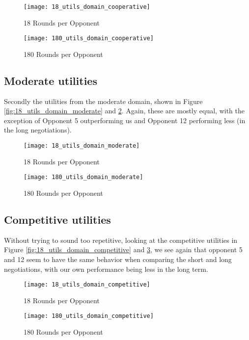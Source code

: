 \begin{figure}[!htb]
	\texttt{[image: 18\_utils\_domain\_cooperative]}
	\caption{18 Rounds per Opponent}
	\label{fig:18_utils_domain_cooperative}
	\endminipage\hfill
	\texttt{[image: 180\_utils\_domain\_cooperative]}
	\caption{180 Rounds per Opponent}
	\label{fig:180_utils_domain_cooperative}
	\endminipage\hfill
\end{figure}

\subsection{Moderate utilities}

Secondly the utilities from the moderate domain, shown in Figure \ref{fig:18_utils_domain_moderate} and \ref{fig:180_utils_domain_moderate}. Again, these are mostly equal, with the exception of Opponent 5 outperforming us and Opponent 12 performing less (in the long negotiations). 

\begin{figure}[!htb]
	\texttt{[image: 18\_utils\_domain\_moderate]}
	\caption{18 Rounds per Opponent}
	\label{fig:18_utils_domain_moderate}
	\endminipage\hfill
	\texttt{[image: 180\_utils\_domain\_moderate]}
	\caption{180 Rounds per Opponent}
	\label{fig:180_utils_domain_moderate}
	\endminipage\hfill
\end{figure}

\subsection{Competitive utilities}

Without trying to sound too repetitive, looking at the competitive utilities in  Figure \ref{fig:18_utils_domain_competitive} and \ref{fig:180_utils_domain_competitive}, we see again that opponent 5 and 12 seem to have the same behavior when comparing the short and long negotiations, with our own performance being less in the long term.

\begin{figure}[!htb]
	\texttt{[image: 18\_utils\_domain\_competitive]}
	\caption{18 Rounds per Opponent}
	\label{fig:18_utils_domain_competitive}
	\endminipage\hfill
	\texttt{[image: 180\_utils\_domain\_competitive]}
	\caption{180 Rounds per Opponent}
	\label{fig:180_utils_domain_competitive}
	\endminipage\hfill
\end{figure}







